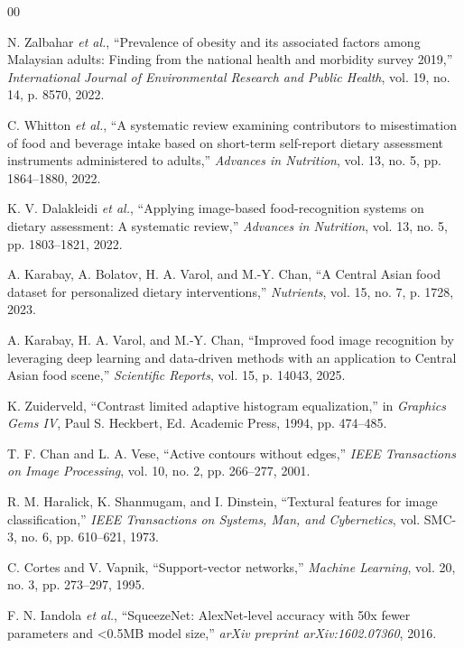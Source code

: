 \documentclass[conference, a4paper]{IEEEtran}
\begin{document}
\begin{thebibliography}{00}

N. Zalbahar \emph{et al.}, ``Prevalence of obesity and its associated factors among Malaysian adults: Finding from the national health and morbidity survey 2019,'' \emph{International Journal of Environmental Research and Public Health}, vol. 19, no. 14, p. 8570, 2022.

C. Whitton \emph{et al.}, ``A systematic review examining contributors to misestimation of food and beverage intake based on short-term self-report dietary assessment instruments administered to adults,'' \emph{Advances in Nutrition}, vol. 13, no. 5, pp. 1864--1880, 2022.

K. V. Dalakleidi \emph{et al.}, ``Applying image-based food-recognition systems on dietary assessment: A systematic review,'' \emph{Advances in Nutrition}, vol. 13, no. 5, pp. 1803--1821, 2022.

A. Karabay, A. Bolatov, H. A. Varol, and M.-Y. Chan, ``A Central Asian food dataset for personalized dietary interventions,'' \emph{Nutrients}, vol. 15, no. 7, p. 1728, 2023.

A. Karabay, H. A. Varol, and M.-Y. Chan, ``Improved food image recognition by leveraging deep learning and data-driven methods with an application to Central Asian food scene,'' \emph{Scientific Reports}, vol. 15, p. 14043, 2025.

K. Zuiderveld, ``Contrast limited adaptive histogram equalization,'' in \emph{Graphics Gems IV}, Paul S. Heckbert, Ed. Academic Press, 1994, pp. 474--485.

T. F. Chan and L. A. Vese, ``Active contours without edges,'' \emph{IEEE Transactions on Image Processing}, vol. 10, no. 2, pp. 266--277, 2001.

R. M. Haralick, K. Shanmugam, and I. Dinstein, ``Textural features for image classification,'' \emph{IEEE Transactions on Systems, Man, and Cybernetics}, vol. SMC-3, no. 6, pp. 610--621, 1973.

C. Cortes and V. Vapnik, ``Support-vector networks,'' \emph{Machine Learning}, vol. 20, no. 3, pp. 273--297, 1995.

F. N. Iandola \emph{et al.}, ``SqueezeNet: AlexNet-level accuracy with 50x fewer parameters and <0.5MB model size,'' \emph{arXiv preprint arXiv:1602.07360}, 2016.


\end{thebibliography}
\end{document}
